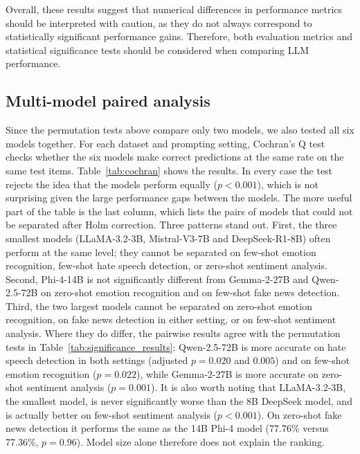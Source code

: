 \documentclass[10pt,letterpaper]{article}
\begin{document}
Overall, these results suggest that numerical differences in performance metrics should be interpreted with caution, as they do not always correspond to statistically significant performance gains. Therefore, both evaluation metrics and statistical significance tests should be considered when comparing LLM performance.

\subsection*{Multi-model paired analysis}

Since the permutation tests above compare only two models, we also tested all six models together. For each dataset and prompting setting, Cochran's Q test checks whether the six models make correct predictions at the same rate on the same test items. Table~\ref{tab:cochran} shows the results. In every case the test rejects the idea that the models perform equally ($p < 0.001$), which is not surprising given the large performance gaps between the models. The more useful part of the table is the last column, which lists the pairs of models that could not be separated after Holm correction. Three patterns stand out. First, the three smallest models (LLaMA-3.2-3B, Mistral-V3-7B and DeepSeek-R1-8B) often perform at the same level; they cannot be separated on few-shot emotion recognition, few-shot hate speech detection, or zero-shot sentiment analysis. Second, Phi-4-14B is not significantly different from Gemma-2-27B and Qwen-2.5-72B on zero-shot emotion recognition and on few-shot fake news detection. Third, the two largest models cannot be separated on zero-shot emotion recognition, on fake news detection in either setting, or on few-shot sentiment analysis. Where they do differ, the pairwise results agree with the permutation tests in Table~\ref{tab:significance_results}: Qwen-2.5-72B is more accurate on hate speech detection in both settings (adjusted $p = 0.020$ and $0.005$) and on few-shot emotion recognition ($p = 0.022$), while Gemma-2-27B is more accurate on zero-shot sentiment analysis ($p = 0.001$). It is also worth noting that LLaMA-3.2-3B, the smallest model, is never significantly worse than the 8B DeepSeek model, and is actually better on few-shot sentiment analysis ($p < 0.001$). On zero-shot fake news detection it performs the same as the 14B Phi-4 model (77.76\% versus 77.36\%, $p = 0.96$). Model size alone therefore does not explain the ranking.
\end{document}
